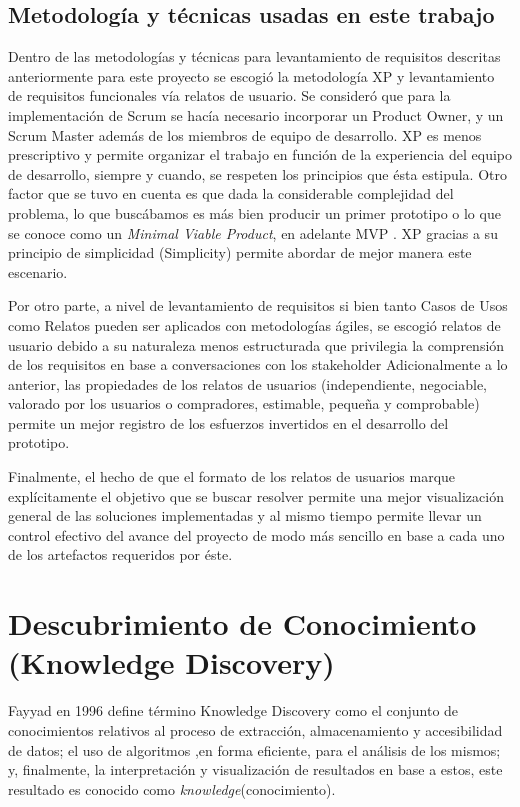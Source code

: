 \subsection{Metodología y técnicas usadas en este trabajo \label{sec:work_decisions}}

Dentro de las metodologías y técnicas para levantamiento de requisitos descritas anteriormente para este proyecto se escogió la metodología XP y levantamiento de requisitos funcionales vía relatos de usuario. Se consideró que para la implementación de Scrum se hacía necesario incorporar un Product Owner, y un Scrum Master además de los miembros de equipo de desarrollo. XP es menos prescriptivo y permite organizar el  trabajo en función de la experiencia del equipo de desarrollo, siempre y cuando, se respeten los principios que ésta estipula.  Otro factor  que se tuvo en cuenta es que dada la considerable complejidad del problema, lo que buscábamos es más bien producir un primer prototipo o lo que se conoce como un \textit{Minimal Viable Product}, en adelante MVP . XP gracias a su principio  de simplicidad (Simplicity) permite abordar de mejor manera este escenario.

Por otro parte, a nivel de levantamiento de requisitos si bien tanto Casos de Usos como Relatos pueden ser aplicados con metodologías ágiles, se escogió relatos de usuario debido a su naturaleza menos estructurada que privilegia la comprensión de los requisitos en base a conversaciones con los  stakeholder Adicionalmente a lo anterior, las propiedades de los relatos de usuarios (independiente, negociable, valorado por los usuarios o compradores, estimable, pequeña y comprobable) permite un mejor registro de los esfuerzos invertidos en el desarrollo del prototipo.

Finalmente, el hecho de que el formato de los relatos de usuarios marque explícitamente el objetivo que se buscar resolver permite una mejor visualización general de las soluciones implementadas y al mismo tiempo permite llevar un control efectivo del avance del proyecto de modo más sencillo en base a cada uno de los artefactos requeridos por éste.

\section{Descubrimiento de Conocimiento (Knowledge Discovery) \label{sec:knowledge_discovery}}
Fayyad \cite{knowledge_discovery} en 1996 define término Knowledge Discovery como el conjunto de conocimientos relativos al proceso de extracción, almacenamiento y accesibilidad de datos; el uso de algoritmos ,en forma eficiente, para el análisis de los mismos; y, finalmente, la interpretación y visualización de resultados en base a estos, este resultado es conocido como \textit{knowledge}(conocimiento).

